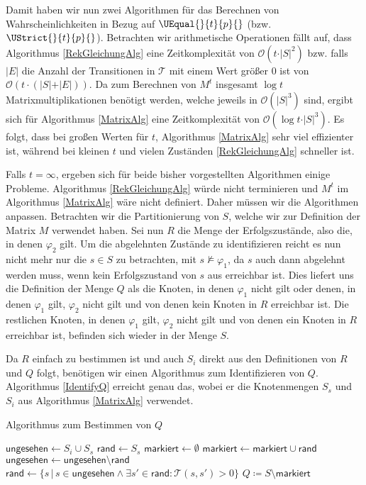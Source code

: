 Damit haben wir nun zwei Algorithmen für das Berechnen von Wahrscheinlichkeiten in Bezug auf $\UEqual{}{t}{p}{}$ (bzw. $\UStrict{}{t}{p}{}$). 
Betrachten wir arithmetische Operationen fällt auf, dass Algorithmus \ref{RekGleichungAlg} eine Zeitkomplexität von $\mathcal{O}(t \cdot \vert S \vert^2)$ bzw. falls $\vert E \vert$ die Anzahl der Transitionen in $\mathcal{T}$ mit einem Wert größer $0$ ist von $\mathcal{O}(t\cdot (\vert S \vert + \vert E \vert))$. 
Da zum Berechnen von $M^t$ insgesamt $\log t$ Matrixmultiplikationen benötigt werden, welche jeweils in $\mathcal{O}(\vert S \vert^3)$ sind, ergibt sich für Algorithmus \ref{MatrixAlg} eine Zeitkomplexität von $\mathcal{O}(\log t \cdot \vert S \vert ^3)$. 
Es folgt, dass bei großen Werten für $t$, Algorithmus \ref{MatrixAlg} sehr viel effizienter ist, während bei kleinen $t$ und vielen Zuständen \ref{RekGleichungAlg} schneller ist. \cite{hansson1994logic}


Falls $t=\infty$, ergeben sich für beide bisher vorgestellten Algorithmen einige Probleme. Algorithmus \ref{RekGleichungAlg} würde nicht terminieren und $M^t$ im Algorithmus \ref{MatrixAlg} wäre nicht definiert.
Daher müssen wir die Algorithmen anpassen. Betrachten wir die Partitionierung von $S$, welche wir zur Definition der Matrix $M$ verwendet haben. 
Sei nun $R$ die Menge der Erfolgszustände, also die, in denen $\varphi_2$ gilt. 
Um die abgelehnten Zustände zu identifizieren reicht es nun nicht mehr nur die $s\in S$ zu betrachten, mit $s\not\models \varphi_1$, da $s$ auch dann abgelehnt werden muss, wenn kein Erfolgszustand von $s$ aus erreichbar ist.
Dies liefert uns die Definition der Menge $Q$ als die Knoten, in denen $\varphi_1$ nicht gilt oder denen, in denen $\varphi_1$ gilt, $\varphi_2$ nicht gilt und von denen kein Knoten in $R$ erreichbar ist.
Die restlichen Knoten, in denen $\varphi_1$ gilt, $\varphi_2$ nicht gilt und von denen ein Knoten in $R$ erreichbar ist, befinden sich wieder in der Menge $S$. \cite{hansson1994logic}

Da $R$ einfach zu bestimmen ist und auch $S_i$ direkt aus den Definitionen von $R$ und $Q$ folgt, benötigen wir einen Algorithmus zum Identifizieren von $Q$. 
Algorithmus \ref{IdentifyQ} erreicht genau das, wobei er die Knotenmengen $S_s$ und $S_i$ aus Algorithmus \ref{MatrixAlg} verwendet.

\begin{algorithm}[h]
	\caption{Algorithmus zum Bestimmen von $Q$ \cite{hansson1994logic}}
	\label{IdentifyQ}
	\begin{algorithmic}
		\State $\mathsf{ungesehen} \gets S_i \cup S_s$
		\State $\mathsf{rand} \gets S_s$
		\State $\mathsf{markiert} \gets \emptyset$
		\State $\mathsf{markiert} \gets \mathsf{markiert}\cup \mathsf{rand}$
		\State $\mathsf{ungesehen} \gets \mathsf{ungesehen} \setminus \mathsf{rand}$
		\State $\mathsf{rand} \gets \{s \, | \, s\in \mathsf{ungesehen} \land \exists s'\in \mathsf{rand}:\mathcal{T}(s,s')>0\}$
		\EndFor
		\State $Q\coloneqq S \setminus \mathsf{markiert}$
	\end{algorithmic}
\end{algorithm}


